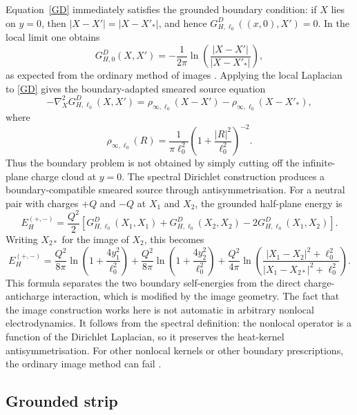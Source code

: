 \documentclass[openacc]{rsproca_new}%
\begin{document}
Equation~\eqref{GD} immediately satisfies the grounded boundary condition: if \(X\) lies on \(y=0\), then \(|X-X'|=|X-X'_*|\), and hence \(G_{H,\ell_0}^D((x,0),X')=0\). In the local limit one obtains
\begin{equation}
  G_{H,0}^D(X,X')=-\frac{1}{2\pi}\ln\left(\frac{|X-X'|}{|X-X'_*|}\right),
\end{equation}
as expected from the ordinary method of images \cite{Jackson1999}. Applying the local Laplacian to \eqref{GD} gives the boundary-adapted smeared source equation
\begin{equation}
  -\nabla_X^2G_{H,\ell_0}^D(X,X')=\rho_{\infty,\ell_0}(X-X')-\rho_{\infty,\ell_0}(X-X'_*),
\end{equation}
where
\begin{equation}
  \rho_{\infty,\ell_0}(R)=\frac{1}{\pi\ell_0^2}\left(1+\frac{|R|^2}{\ell_0^2}\right)^{-2}.
\end{equation}
Thus the boundary problem is not obtained by simply cutting off the infinite-plane charge cloud at \(y=0\). The spectral Dirichlet construction produces a boundary-compatible smeared source through antisymmetrisation. For a neutral pair with charges \(+Q\) and \(-Q\) at \(X_1\) and \(X_2\), the grounded half-plane energy is
\begin{equation}
  E_H^{(+,-)}=\frac{Q^2}{2}\left[G_{H,\ell_0}^D(X_1,X_1)+G_{H,\ell_0}^D(X_2,X_2)-2G_{H,\ell_0}^D(X_1,X_2)\right].
\end{equation}
Writing \(X_{2*}\) for the image of \(X_2\), this becomes
\begin{equation}
  E_H^{(+,-)}=\frac{Q^2}{8\pi}\ln\left(1+\frac{4y_1^2}{\ell_0^2}\right)
  +\frac{Q^2}{8\pi}\ln\left(1+\frac{4y_2^2}{\ell_0^2}\right)
  +\frac{Q^2}{4\pi}\ln\left(\frac{|X_1-X_2|^2+\ell_0^2}{|X_1-X_{2*}|^2+\ell_0^2}\right).
\end{equation}
This formula separates the two boundary self-energies from the direct charge-anticharge interaction, which is modified by the image geometry. The fact that the image construction works here is not automatic in arbitrary nonlocal electrodynamics. It follows from the spectral definition: the nonlocal operator is a function of the Dirichlet Laplacian, so it preserves the heat-kernel antisymmetrisation. For other nonlocal kernels or other boundary prescriptions, the ordinary image method can fail \cite{BorgesBufalo2025}.

\subsection{Grounded strip}\label{subsec:strip}
\end{document}
